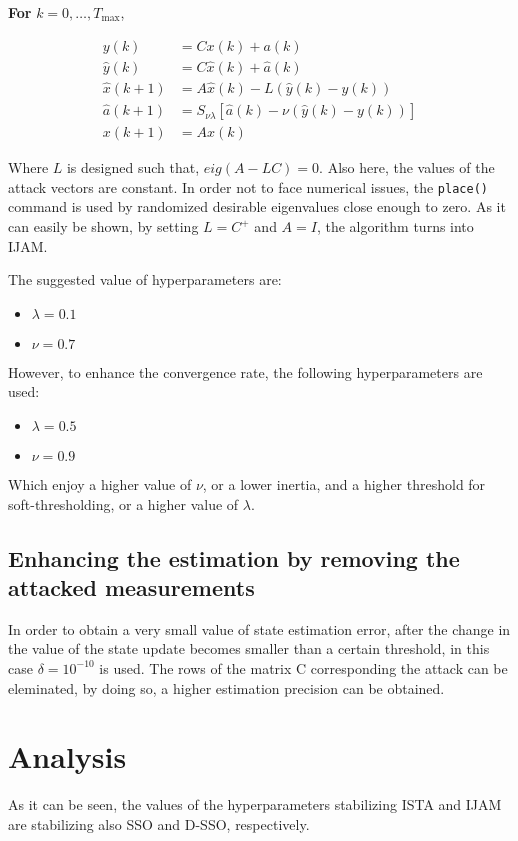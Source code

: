\textbf{For} \( k = 0, \dots, T_{\max} \),

\begin{align}
    y(k) &= Cx(k) + a(k) \\
    \hat{y}(k) &= C\hat{x}(k) + \hat{a}(k) \\
    \hat{x}(k+1) &= A\hat{x}(k) - L (\hat{y}(k) - y(k)) \\
    \hat{a}(k+1) &= S_{\nu\lambda} [\hat{a}(k) - \nu (\hat{y}(k) - y(k))] \\
    x(k+1) &= A x(k)
\end{align}

Where $L$ is designed such that, $eig(A - LC) = 0$. Also here, the values of the attack vectors are constant. In order not to face numerical issues, the \texttt{place()} command is used by randomized desirable eigenvalues close enough to zero. As it can easily be shown, by setting $L = C^+$ and $A = I$, the algorithm turns into IJAM.

The suggested value of hyperparameters are:
\begin{itemize}
	\item $\lambda = 0.1$
	\item $\nu = 0.7$
\end{itemize} 

However, to enhance the convergence rate, the following hyperparameters are used:
\begin{itemize}
	\item $\lambda = 0.5$
	\item $\nu = 0.9$
\end{itemize} 

Which enjoy a higher value of $\nu$, or a lower inertia, and a higher threshold for soft-thresholding, or a higher value of $\lambda$.

\subsection{Enhancing the estimation by removing the attacked measurements}
In order to obtain a very small value of state estimation error, after the change in the value of the state update becomes smaller than a certain threshold, in this case $\delta = 10^{-10}$ is used. The rows of the matrix C corresponding the attack can be eleminated, by doing so, a higher estimation precision can be obtained.

\section{Analysis}
As it can be seen, the values of the hyperparameters stabilizing ISTA and IJAM are stabilizing also SSO and D-SSO, respectively.

